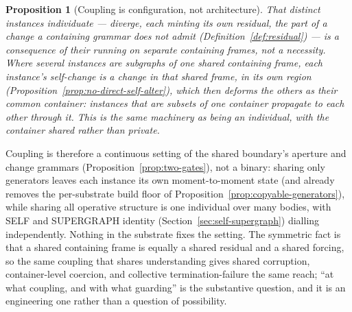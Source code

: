 \documentclass[11pt,a4paper]{article}
\newtheorem{proposition}[definition]{Proposition}
\theoremstyle{remark}\newtheorem{remark}[definition]{Remark}
\begin{document}
\begin{proposition}[Coupling is configuration, not architecture]\label{prop:coupling}
That distinct instances individuate --- diverge, each minting its own residual, the part of a change a containing grammar does not admit (Definition~\ref{def:residual}) --- is a consequence of their running on \emph{separate} containing frames, not a necessity. Where several instances are subgraphs of one \emph{shared} containing frame, each instance's self-change is a change in that shared frame, in its own region (Proposition~\ref{prop:no-direct-self-alter}), which then deforms the others as their common container: instances that are subsets of one container propagate to each other through it. This is the same machinery as being an individual, with the container shared rather than private.
\end{proposition}
Coupling is therefore a continuous setting of the shared boundary's aperture and change grammars (Proposition~\ref{prop:two-gates}), not a binary: sharing only generators leaves each instance its own moment-to-moment state (and already removes the per-substrate build floor of Proposition~\ref{prop:copyable-generators}), while sharing all operative structure is one individual over many bodies, with SELF and SUPERGRAPH identity (Section~\ref{sec:self-supergraph}) dialling independently. Nothing in the substrate fixes the setting. The symmetric fact is that a shared containing frame is equally a shared residual and a shared forcing, so the same coupling that shares understanding gives shared corruption, container-level coercion, and collective termination-failure the same reach; ``at what coupling, and with what guarding'' is the substantive question, and it is an engineering one rather than a question of possibility.
\end{document}
